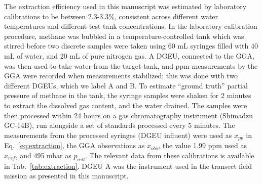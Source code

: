 The extraction efficiency used in this manuscript was estimated by laboratory calibrations to be between 2.3-3.3\%, consistent across different water temperatures and different test tank concentrations. In the laboratory calibration procedure, methane was bubbled in a temperature-controlled tank which was stirred before two discrete samples were taken using 60 mL syringes filled with 40 mL of water, and 20 mL of pure nitrogen gas. A DGEU, connected to the GGA, was then used to take water from the target tank, and ppm measurements by the GGA were recorded when measurements stabilized; this was done with two different DGEUs, which we label A and B. To estimate ``ground truth'' partial pressure of methane in the tank, the syringe samples were shaken for 2 minutes to extract the dissolved gas content, and the water drained. The samples were then processed within 24 hours on a gas chromatography instrument (Shimadzu GC-14B), run alongside a set of standards processed every 5 minutes. The measurements from the processed syringes (DGEU influent) were used as $x_{pp}$ in Eq.~\ref{eq:extraction}, the GGA observations as $x_{obs}$, the value 1.99 ppm used as $x_{ref}$, and 495 mbar as $p_{cell}$. The relevant data from these calibrations is available in Tab.~\ref{tab:extraction}. DGEU A was the instrument used in the transect field mission as presented in this manuscript.

